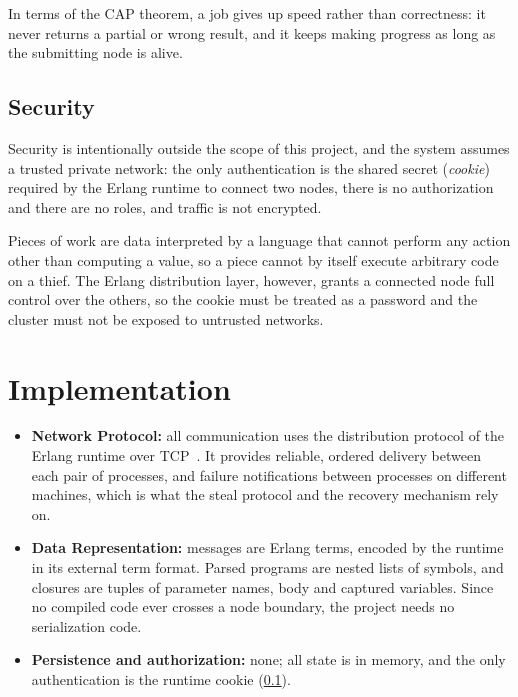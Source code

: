 \documentclass{scrartcl}
\begin{document}
In terms of the CAP theorem, a job gives up speed rather than correctness: it never returns a partial or wrong result, and it keeps making progress as long as the submitting node is alive.

\subsection{Security}\label{security}

Security is intentionally outside the scope of this project, and the system assumes a trusted private network: the only authentication is the shared secret (\emph{cookie}) required by the Erlang runtime to connect two nodes, there is no authorization and there are no roles, and traffic is not encrypted.

Pieces of work are data interpreted by a language that cannot perform any action other than computing a value, so a piece cannot by itself execute arbitrary code on a thief.
%
The Erlang distribution layer, however, grants a connected node full control over the others, so the cookie must be treated as a password and the cluster must not be exposed to untrusted networks.

\section{Implementation}\label{implementation}

\begin{itemize}
  \item \textbf{Network Protocol:} all communication uses the distribution protocol of the Erlang runtime over TCP~\cite{erlangdistributed}. It provides reliable, ordered delivery between each pair of processes, and failure notifications between processes on different machines, which is what the steal protocol and the recovery mechanism rely on.

  \item \textbf{Data Representation:} messages are Erlang terms, encoded by the runtime in its external term format. Parsed programs are nested lists of symbols, and closures are tuples of parameter names, body and captured variables. Since no compiled code ever crosses a node boundary, the project needs no serialization code.

  \item \textbf{Persistence and authorization:} none; all state is in memory, and the only authentication is the runtime cookie (\cref{security}).
\end{itemize}
\end{document}

